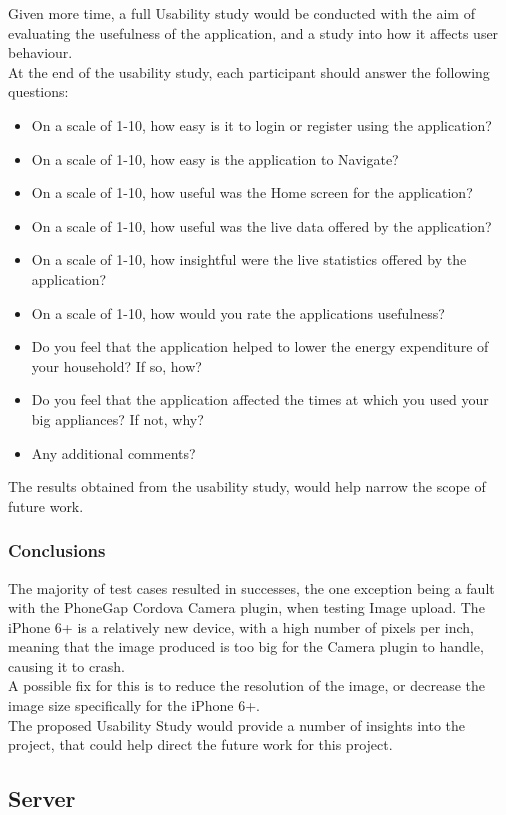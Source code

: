 \documentclass[preprint,12pt,3p]{elsarticle}
\begin{document}
Given more time, a full Usability study would be conducted with the aim of evaluating the usefulness of the application, and a study into how it affects user behaviour.\\
At the end of the usability study, each participant should answer the following questions:
\begin{itemize}
\item On a scale of 1-10, how easy is it to login or register using the application?
\item On a scale of 1-10, how easy is the application to Navigate?
\item On a scale of 1-10, how useful was the Home screen for the application?
\item On a scale of 1-10, how useful was the live data offered by the application?
\item On a scale of 1-10, how insightful were the live statistics offered by the application?
\item On a scale of 1-10, how would you rate the applications usefulness?
\item Do you feel that the application helped to lower the energy expenditure of your household? If so, how?
\item Do you feel that the application affected the times at which you used your big appliances? If not, why?
\item Any additional comments?
\end{itemize}
The results obtained from the usability study, would help narrow the scope of future work.

\subsubsection{Conclusions}
The majority of test cases resulted in successes, the one exception being a fault with the PhoneGap Cordova Camera plugin, when testing Image upload. The iPhone 6+ is a relatively new device, with a high number of pixels per inch, meaning that the image produced is too big for the Camera plugin to handle, causing it to crash.\\
A possible fix for this is to reduce the resolution of the image, or decrease the image size specifically for the iPhone 6+.\\
The proposed Usability Study would provide a number of insights into the project, that could help direct the future work for this project.


\subsection{Server}
\end{document}
